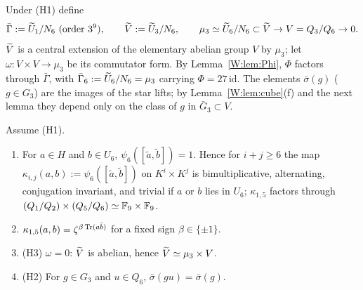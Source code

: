 Under (H1) define
\[
 \bar\Gamma:=\tU_1/N_6\ (\text{order }3^9),\qquad
 \tV:=\tU_3/N_6,\qquad
 \mu_3\simeq\tU_6/N_6\subset\tV\to V=Q_3/Q_6\to0 .
\]
$\widetilde V$ is a central extension of the elementary abelian group $V$ by
$\mu_3$; let $\omega:V\times V\to\mu_3$ be its commutator form.  By
Lemma~\ref{W:lem:Phi}, $\Phi$ factors through $\bar\Gamma$, with
$\bar\Gamma_6:=\widetilde U_6/N_6=\mu_3$ carrying $\Phi=27\,\mathrm{id}$.  The
elements $\bar\sigma(g)$ ($g\in G_3$) are the images of the star lifts;
by Lemma~\ref{W:lem:cube}(f) and the next lemma they depend only on the
class of $g$ in $\bar G_3\subset V$.

\begin{lemma}\label{W:lem:H1consequences}
Assume (H1).
\begin{enumerate}[label=(\alph*)]
\item For $a\in H$ and $b\in U_6$, $\psi_6([\tilde a,\tilde b])=1$.  Hence for
$i+j\ge6$ the map $\kappa_{i,j}(a,b):=\psi_6([\tilde a,\tilde b])$ on
$K^i\times K^j$ is bimultiplicative, alternating, conjugation
invariant, and trivial if $a$ or $b$ lies in $U_6$; $\kappa_{1,5}$
factors through $(Q_1/Q_2)\times(Q_5/Q_6)\simeq\mathbb F_9\times\mathbb F_9$.
\item $\kappa_{1,5}(a,b)=\zeta^{\beta\operatorname{Tr}(a\bar b)}$ for a fixed sign
$\beta\in\{\pm1\}$.
\item (H3) $\omega=0$: $\widetilde V$ is abelian, hence $\widetilde V\simeq\mu_3\times V$.
\item (H2) For $g\in G_3$ and $u\in Q_6$, $\bar\sigma(gu)=\bar\sigma(g)$.
\end{enumerate}
\end{lemma}
